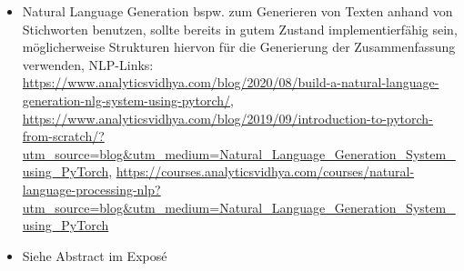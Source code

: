 \begin{itemize}
	\item Natural Language Generation bspw. zum Generieren von Texten anhand von Stichworten benutzen, sollte bereits in gutem Zustand implementierfähig sein, möglicherweise Strukturen hiervon für die Generierung der Zusammenfassung verwenden, NLP-Links: \url{https://www.analyticsvidhya.com/blog/2020/08/build-a-natural-language-generation-nlg-system-using-pytorch/}, \url{https://www.analyticsvidhya.com/blog/2019/09/introduction-to-pytorch-from-scratch/?utm_source=blog&utm_medium=Natural_Language_Generation_System_using_PyTorch}, \url{https://courses.analyticsvidhya.com/courses/natural-language-processing-nlp?utm_source=blog&utm_medium=Natural_Language_Generation_System_using_PyTorch}
	\item Siehe Abstract im Exposé
\end{itemize}
